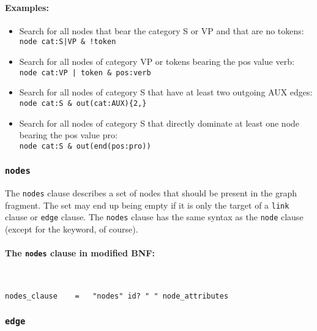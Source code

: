 \documentclass[12pt]{scrartcl}
\begin{document}
\paragraph*{Examples:}
\begin{itemize}
	\item Search for all nodes that bear the category S or VP and that are no tokens:\\
	{\tt node cat:S|VP \& !token}
	\item Search for all nodes of category VP or tokens bearing the pos value verb:\\
	{\tt node cat:VP | token \& pos:verb}
	\item Search for all nodes of category S that have at least two outgoing AUX edges:\\
	{\tt node cat:S \& out(cat:AUX)\{2,\}}
	\item Search for all nodes of category S that directly dominate at least one node bearing the pos value pro:\\
	{\tt node cat:S \& out(end(pos:pro))}
\end{itemize}




\subsubsection{\texttt{nodes}}

The \texttt{nodes} clause describes a set of nodes that should be present in the graph fragment.
The set may end up being empty if it is only the target of a \texttt{link} clause or \texttt{edge} clause.
The \texttt{nodes} clause has the same syntax as the \texttt{node} clause (except for the keyword, of course).


\paragraph*{The \texttt{nodes} clause in modified BNF:}
~
\begin{framed}
\begin{lstlisting}
nodes_clause    =   "nodes" id? " " node_attributes
\end{lstlisting}
\end{framed}





\subsubsection{\texttt{edge}}\label{edge}
\end{document}
